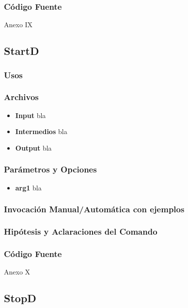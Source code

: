 \documentclass[a4paper,10pt,titlepage]{article}
\begin{document}
		\subsubsection{C\'odigo Fuente}
			Anexo IX

	\subsection{StartD}
		\subsubsection{Usos}


		\subsubsection{Archivos}
			\begin {itemize}
				\item \textbf{Input} {bla}
				\item \textbf{Intermedios} {bla}
				\item \textbf{Output} {bla}
			\end{itemize}

		\subsubsection{Par\'ametros y Opciones}
			\begin {itemize}
				\item \textbf{arg1} {bla}
			\end{itemize}
	
		\subsubsection{Invocaci\'on Manual/Autom\'atica con ejemplos}

		\subsubsection{Hip\'otesis y Aclaraciones del Comando}

		\subsubsection{C\'odigo Fuente}
			Anexo X


	\subsection{StopD}
\end{document}
